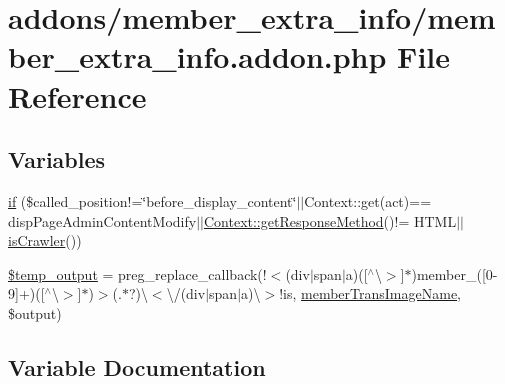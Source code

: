 \hypertarget{member__extra__info_8addon_8php}{}\section{addons/member\+\_\+extra\+\_\+info/member\+\_\+extra\+\_\+info.addon.\+php File Reference}
\label{member__extra__info_8addon_8php}
\subsection*{Variables}
\begin{DoxyCompactItemize}
\item 
\hyperlink{member__extra__info_8addon_8php_a29031816e50a8f742422e671b2bef9b2}{if} (\$called\+\_\+position!=\char`\"{}before\+\_\+display\+\_\+content\char`\"{}$\vert$$\vert$Context\+::get(\textquotesingle{}act\textquotesingle{})== \textquotesingle{}disp\+Page\+Admin\+Content\+Modify\textquotesingle{}$\vert$$\vert$\hyperlink{classContext_a1d02a15209360034cd719d8b08cb5061}{Context\+::get\+Response\+Method}()!= \textquotesingle{}H\+T\+M\+L\textquotesingle{}$\vert$$\vert$\hyperlink{func_8inc_8php_a490ffbd4821da1995c76c381553d5b3d}{is\+Crawler}())
\item 
\hyperlink{member__extra__info_8addon_8php_a5866ef6f77cbeaf87d8208cf805bbc3d}{\$temp\+\_\+output} = preg\+\_\+replace\+\_\+callback(\textquotesingle{}!$<$(div$\vert$span$\vert$a)(\mbox{[}$^\wedge$\textbackslash{}$>$\mbox{]}$\ast$)member\+\_\+(\mbox{[}0-\/9\mbox{]}+)(\mbox{[}$^\wedge$\textbackslash{}$>$\mbox{]}$\ast$)$>$(.$\ast$?)\textbackslash{}$<$\textbackslash{}/(div$\vert$span$\vert$a)\textbackslash{}$>$!is\textquotesingle{}, \textquotesingle{}\hyperlink{member__extra__info_8lib_8php_a21882e797e0da66aed32f1cf3053eaf2}{member\+Trans\+Image\+Name}\textquotesingle{}, \$output)
\end{DoxyCompactItemize}


\subsection{Variable Documentation}
\hypertarget{member__extra__info_8addon_8php_a5866ef6f77cbeaf87d8208cf805bbc3d}{}
